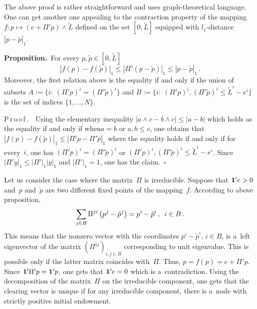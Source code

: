 \begin{multicols}{2}
\smallskip


The above proof  is rather straightforward and uses graph-theoretical language.  
One can get another one  appealing to the contraction property of the mapping 
$f:p\mapsto (e+\Pi'p)\wedge \tilde L$ defined on the set $[0,\tilde L]$ equipped 
with $l_1$-distance $|p-\tilde p|_1$.

\smallskip

\noindent
\textbf{Proposition.}\
For every $p,\tilde p\in [0,\tilde L]$
\begin{equation*}
\left\vert f(p)-f(\tilde p)\right\vert_1\le \left\vert\Pi' (p-\tilde p)
\right\vert_1\le \left\vert p-\tilde p\right\vert_1\,.
\end{equation*}
Moreover, the first relation above is the equality if and only if the
union of subsets $A:=\{i:\ (\Pi'p)^i=(\Pi'\tilde p)^i\}$ and $B:=\{i:\ 
(\Pi'p)^i,(\Pi'\tilde p)^i\le \tilde L^i-e^i\}$ is the set of indices 
$\{1,\dots, N\}$.

\smallskip

\noindent
P\,r\,o\,o\,f\,.\ \ Using the elementary inequality $|a\wedge c-b\wedge c|$\linebreak $\le |a-b|$ 
which holds as  the
equality if and only if when\linebreak $a=b$ or $a,b\le c$, one obtains that
$|f(p)-f(\tilde p)|_1$\linebreak $\le |\Pi'p-\Pi'\tilde p|_1$
where the equality holds if and only if for every~$i$, one has 
$(\Pi'p)^i=(\Pi'\tilde p)^i$ or
$(\Pi'p)^i,(\Pi'\tilde p)^i$\linebreak $\le \tilde L^i-e^i$. Since $|\Pi'y|_1\le 
|\Pi'|_1|y|_1$ and $|\Pi'|_1=1$, one has the claim.~$\square$

\smallskip

Let us consider  the case where the matrix~$\Pi$ is irreducible. Suppose that 
${\bf 1}'e>0$ and~$p$ and~$\tilde p$ are two different fixed points of the 
mapping~$f$. According to above proposition,
$$
\sum\limits_{j\in B}\Pi^{ji}\left(p^j-\tilde p^j\right)=p^ i-\tilde p^i\,, \enskip i\in B\,.
$$
This means that  the nonzero vector with the coordinates $p^ i-\tilde p^i$, 
$i\in B$, is a~left eigenvector of the matrix
$(\Pi^{ij})_{i,j\in B}$ corresponding to unit eigenvalue. This is possible only 
if the latter matrix coincides with~$\Pi$. Thus, $p=f(p)=e+\Pi'p$. Since  
${\bf 1}'\Pi'p={\bf 1}'p$, one gets that ${\bf 1}'e=0$
which is a~contradiction.  Using the decomposition of the matrix~$\Pi$ on the 
irreducible component, one gets that  the clearing vector  is unique if for any 
irreducible component, there is a~node with strictly positive initial endowment.




\end{multicols}
